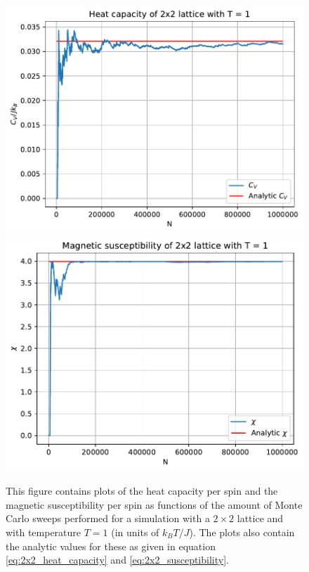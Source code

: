 \documentclass[reprint,english,notitlepage]{revtex4-1}  %
\begin{document}
\begin{figure}[H]
\centering
\includegraphics[width=\columnwidth]{../data/t10-2x2-Cv.pdf}
\includegraphics[width=\columnwidth]{../data/t10-2x2-Xi.pdf}
\caption{This figure contains plots of the heat capacity per spin and the magnetic susceptibility per spin as functions of the amount of Monte Carlo sweeps performed for a simulation with a $2\times 2$ lattice and with temperature $T=1$ (in units of $k_B T/J$). The plots also contain the analytic values for these as given in equation \eqref{eq:2x2_heat_capacity} and \eqref{eq:2x2_susceptibility}.} \label{fig:t10_2x2_heat_capacity_susceptibility}
\end{figure}
\end{document}
